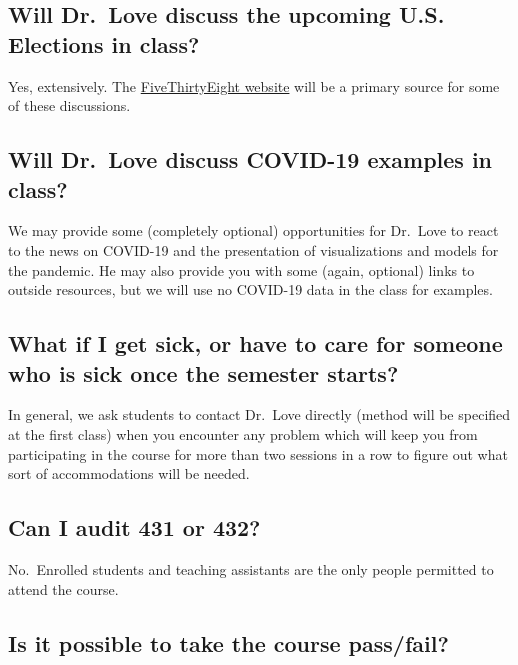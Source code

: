 \documentclass[
]{book}
\begin{document}
\hypertarget{will-dr.-love-discuss-the-upcoming-u.s.-elections-in-class}{%
\subsection{Will Dr.~Love discuss the upcoming U.S. Elections in class?}\label{will-dr.-love-discuss-the-upcoming-u.s.-elections-in-class}}

Yes, extensively. The \href{https://fivethirtyeight.com/}{FiveThirtyEight website} will be a primary source for some of these discussions.

\hypertarget{will-dr.-love-discuss-covid-19-examples-in-class}{%
\subsection{Will Dr.~Love discuss COVID-19 examples in class?}\label{will-dr.-love-discuss-covid-19-examples-in-class}}

We may provide some (completely optional) opportunities for Dr.~Love to react to the news on COVID-19 and the presentation of visualizations and models for the pandemic. He may also provide you with some (again, optional) links to outside resources, but we will use no COVID-19 data in the class for examples.

\hypertarget{what-if-i-get-sick-or-have-to-care-for-someone-who-is-sick-once-the-semester-starts}{%
\subsection{What if I get sick, or have to care for someone who is sick once the semester starts?}\label{what-if-i-get-sick-or-have-to-care-for-someone-who-is-sick-once-the-semester-starts}}

In general, we ask students to contact Dr.~Love directly (method will be specified at the first class) when you encounter any problem which will keep you from participating in the course for more than two sessions in a row to figure out what sort of accommodations will be needed.

\hypertarget{can-i-audit-431-or-432}{%
\subsection{Can I audit 431 or 432?}\label{can-i-audit-431-or-432}}

No.~Enrolled students and teaching assistants are the only people permitted to attend the course.

\hypertarget{is-it-possible-to-take-the-course-passfail}{%
\subsection{Is it possible to take the course pass/fail?}\label{is-it-possible-to-take-the-course-passfail}}
\end{document}

